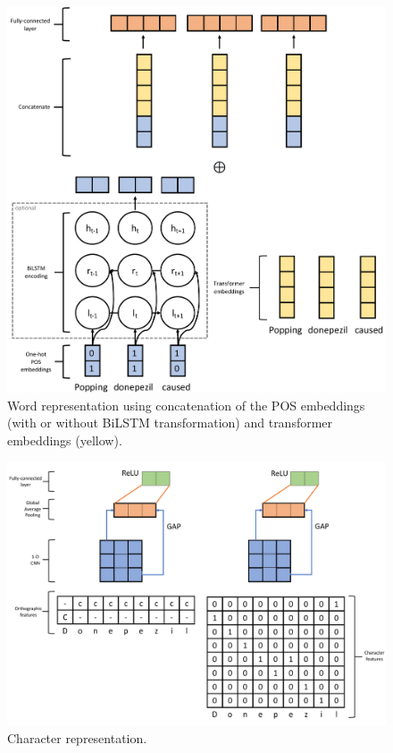 \documentclass[11pt]{article}
\begin{document}
\begin{figure}[!htbp]
    \centering
    \includegraphics[width=\columnwidth]{figures/word_arch.pdf}
    \caption{Word representation using concatenation of the POS embeddings (with or without BiLSTM transformation) and transformer embeddings (yellow).}
    \label{fig:task2_word}
\end{figure}


\begin{figure}[!htbp]
    \centering
    \includegraphics[width=\columnwidth]{figures/word_arch2.pdf}
    \caption{Character representation.}
    \label{fig:task2_char}
\end{figure}
%
%
%
\end{document}
